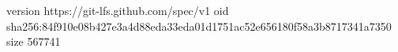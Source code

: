 version https://git-lfs.github.com/spec/v1
oid sha256:84f910e08b427e3a4d88eda33eda01d1751ac52e656180f58a3b8717341a7350
size 567741
